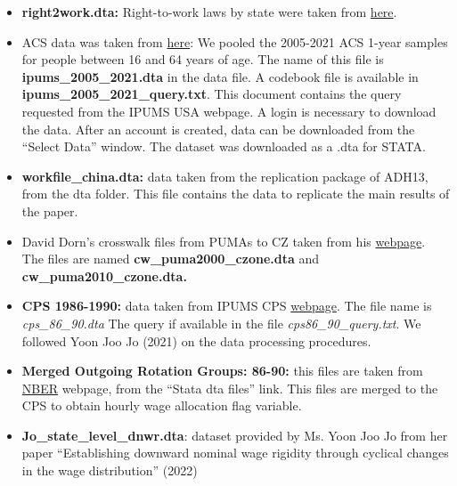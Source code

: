 \documentclass[12pt]{article}
\begin{document}
\begin{itemize}
   \item \textbf{right2work.dta:} Right-to-work laws by state were taken from \href{https://nrtwc.org/facts/state-right-to-work-timeline-2016/}{here}.

    \item ACS data was taken from \href{https://usa.ipums.org/usa}{here}: We pooled
    the 2005-2021 ACS 1-year samples for people between 16 and 64 years
    of age. The name of this file is \textbf{ipums\_2005\_2021.dta} in the data
    file. A codebook file is available in  \textbf{ipums\_2005\_2021\_query.txt}. This document contains the query requested from the IPUMS USA webpage. A login is
    necessary to download the data. After an account is created, data can be downloaded from the ``Select Data'' window. The dataset was downloaded as a .dta
    for STATA.

   \item \textbf{workfile\_china.dta:} data taken from the replication package of
    ADH13, from the dta folder. This file contains the data to replicate the main         results of the paper.

   \item David Dorn's crosswalk files from PUMAs to CZ taken from his \href{https://www.ddorn.net/}{webpage}. The files
    are named \textbf{cw\_puma2000\_czone.dta} and \textbf{cw\_puma2010\_czone.dta.}

    \item \textbf{CPS 1986-1990:} data taken from IPUMS CPS \href{https://cps.ipums.org/cps/}{webpage}. The file name is \textit{cps\_86\_90.dta} The query if available in the file \textit{cps86\_90\_query.txt}. We followed Yoon Joo Jo (2021) on the data processing procedures.

    \item \textbf{Merged Outgoing Rotation Groups: 86-90:} this files are taken from \href{https://www.nber.org/research/data/current-population-survey-cps-merged-outgoing-rotation-group-earnings-data}{NBER} webpage, from the ``Stata dta files'' link. This files are merged to the CPS to obtain hourly wage allocation flag variable.

    \item \textbf{Jo\_state\_level\_dnwr.dta}: dataset provided by Ms. Yoon Joo Jo from her paper ``Establishing downward nominal wage rigidity through cyclical changes in the wage distribution'' (2022)

\end{itemize}
\end{document}
